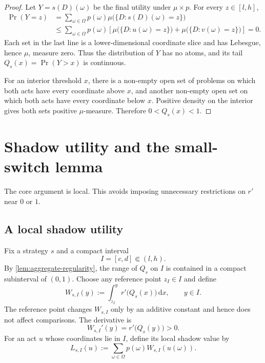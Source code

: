 \documentclass[11pt,a4paper]{article}
\theoremstyle{definition}
\newcommand{\dd}{\,\mathrm d}
\begin{document}
\begin{proof}
Let $Y=s(D)(\omega)$ be the final utility under $\mu\times p$. For every
$z\in[l,h]$,
\begin{align*}
 \Pr(Y=z)
 &=\sum_{\omega\in\Omega}p(\omega)
   \mu\bigl(\{D:s(D)(\omega)=z\}\bigr)\\
 &\leq
 \sum_{\omega\in\Omega}p(\omega)
 \left[
   \mu\bigl(\{D:u(\omega)=z\}\bigr)
  +\mu\bigl(\{D:v(\omega)=z\}\bigr)
 \right]
 =0.
\end{align*}
Each set in the last line is a lower-dimensional coordinate slice and has
Lebesgue, hence $\mu$, measure zero. Thus the distribution of $Y$ has no
atoms, and its tail $Q_s(x)=\Pr(Y>x)$ is continuous.

For an interior threshold $x$, there is a non-empty open set of problems on
which both acts have every coordinate above $x$, and another non-empty open
set on which both acts have every coordinate below $x$. Positive density on
the interior gives both sets positive $\mu$-measure. Therefore
$0<Q_s(x)<1$.
\end{proof}

\section{Shadow utility and the small-switch lemma}

The core argument is local. This avoids imposing unnecessary restrictions on
$r'$ near $0$ or $1$.

\subsection{A local shadow utility}

Fix a strategy $s$ and a compact interval
\[
 I=[c,d]\Subset(l,h).
\]
By \cref{lem:aggregate-regularity}, the range of $Q_s$ on $I$ is contained in
a compact subinterval of $(0,1)$. Choose any reference point $z_I\in I$ and
define
\begin{equation}\label{eq:local-shadow-utility}
 W_{s,I}(y)
 :=\int_{z_I}^{y}r'\bigl(Q_s(x)\bigr)\dd x,
 \qquad y\in I.
\end{equation}
The reference point changes $W_{s,I}$ only by an additive constant and hence
does not affect comparisons. The derivative is
\[
 W_{s,I}'(y)=r'\bigl(Q_s(y)\bigr)>0.
\]
For an act $u$ whose coordinates lie in $I$, define its local shadow value by
\begin{equation}\label{eq:local-shadow-value}
 L_{s,I}(u)
 :=\sum_{\omega\in\Omega}p(\omega)W_{s,I}(u(\omega)).
\end{equation}
\end{document}
